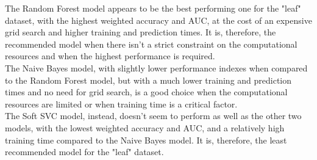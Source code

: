 \documentclass{article}
\begin{document}
The Random Forest model appears to be the best performing one for the "leaf" dataset, with the highest weighted accuracy and AUC,
at the cost of an expensive grid search and higher training and prediction times. It is, therefore, the recommended model when 
there isn't a strict constraint on the computational resources and when the highest performance is required.\\
The Naive Bayes model, with slightly lower performance indexes when compared to the Random Forest model,
but with a much lower training and prediction times and no need for grid search, is a good choice when
the computational resources are limited or when training time is a critical factor.\\
The Soft SVC model, instead, doesn't seem to perform as well as the other two models, with the lowest weighted accuracy and AUC,
and a relatively high training time compared to the Naive Bayes model. It is, therefore, the least recommended model for the "leaf" dataset.





\end{document}
